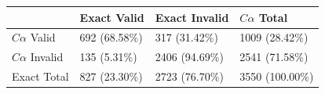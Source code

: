 \begin{tabular}{llll}
\toprule
 & Exact Valid & Exact Invalid & $C\alpha$ Total \\
\midrule
$C\alpha$ Valid & 692 (68.58\%) & 317 (31.42\%) & 1009 (28.42\%) \\
$C\alpha$ Invalid & 135 (5.31\%) & 2406 (94.69\%) & 2541 (71.58\%) \\
Exact Total & 827 (23.30\%) & 2723 (76.70\%) & 3550 (100.00\%) \\
\bottomrule
\end{tabular}
